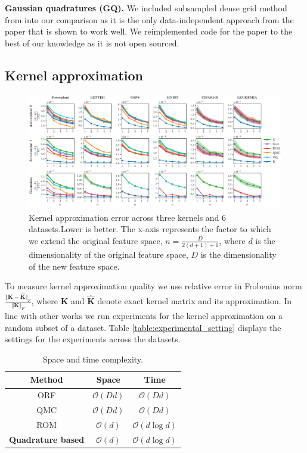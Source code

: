 \textbf{Gaussian quadratures (GQ).}
We included subsampled dense grid method from \citep{dao2017gaussian} into our comparison as
it is the only data-independent approach from the paper that is shown to work well.
We reimplemented code for the paper to the best of our knowledge as it is not open sourced.

\subsection{Kernel approximation}
\label{sub:kernelapprox}

\begin{figure}[t]
\centering
\includegraphics[width=\textwidth]{figures/quadratures/kernel_acc}
\caption{Kernel approximation error across three kernels and 6 datasets.Lower is better. The x-axis represents the factor to which we extend the original feature space, $n = \frac{D}{2(d+1)+1}$, where $d$ is the dimensionality of the original feature space, $D$ is the dimensionality of the new feature space.}
\label{fig:KA}
\end{figure}
To measure kernel approximation quality we use relative error in Frobenius norm
$\frac{\Vert \mathbf{K} - \mathbf{\hat{K}}\Vert_{F}}{\Vert \mathbf{K} \Vert_{F}}$,
where $\mathbf{K}$ and $\mathbf{\hat{K}}$ denote exact kernel matrix and its approximation.
In line with other works we run experiments for the kernel approximation on a random
subset of a dataset.
Table \ref{table:experimental_setting} displays the settings for the experiments across the
datasets.
\begin{table}[h]
    \centering
    \caption{Space and time complexity.}
    \label{table:complexity}
    \begin{tabular}{ c  c  c }
    \textbf{Method} & \textbf{Space} & \textbf{Time} \\
    \hline
    ORF & $\mathcal{O}(Dd)$ & $\mathcal{O}(Dd)$ \\
    QMC & $\mathcal{O}(Dd)$ & $\mathcal{O}(Dd)$ \\
    ROM & $\mathcal{O}(d)$ & $\mathcal{O}(d\log d)$ \\
    \textbf{Quadrature based} & $\mathcal{O}(d)$ & $\mathcal{O}(d\log d)$ \\
    \hline
    \end{tabular}
\end{table}

